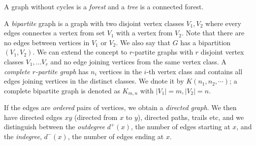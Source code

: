 A graph without cycles is a \emph{forest} and a \emph{tree} is a connected forest.

A \emph{bipartite} graph is a graph with two disjoint vertex classes $V_1, V_2$ where every edges connectes a vertex from set $V_1$ with a vertex from $V_2$. Note that there are no edges between vertices in $V_1$ or $V_2$. We also say that $G$ has a bipartition $(V_1, V_2)$. We can extend the concept to $r$-partite graphs with $r$ disjoint vertex classes $V_1, \ldots V_r$ and no edge joining vertices from the same vertex class. A \emph{complete $r$-partite graph} has $n_i$ vertices in the $i$-th vertex class and contains all edges joining vertices in the distinct classes. We dnote it by $K(n_1, n_2, \cdots)$; a complete bipartite graph is denoted as $K_{m,n}$ with $|V_1|=m, |V_2|=n$.

If the edges are \emph{ordered} pairs of vertices, we obtain a \emph{directed graph}. We then have directed edges $xy$ (directed from $x$ to $y$), directed paths, trails etc, and we distinguish between the \emph{outdegree} $d^+(x)$, the number of edges starting at $x$, and the \emph{indegree}, $d^-(x)$, the number of edges ending at $x$.

  
